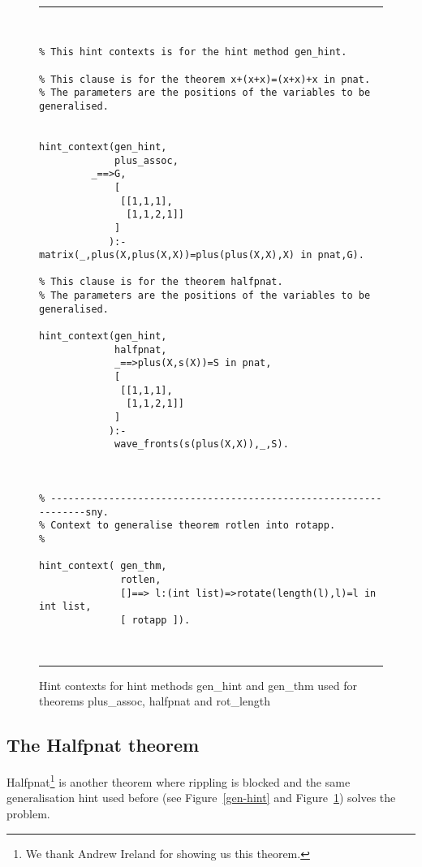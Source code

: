 \begin{figure}[htb] \begin{center} %
\hrule
\begin{small} 
\begin{verbatim} 


% This hint contexts is for the hint method gen_hint.

% This clause is for the theorem x+(x+x)=(x+x)+x in pnat.
% The parameters are the positions of the variables to be generalised. 


hint_context(gen_hint,
             plus_assoc,
	     _==>G,
             [
              [[1,1,1],
               [1,1,2,1]]
             ]
            ):- matrix(_,plus(X,plus(X,X))=plus(plus(X,X),X) in pnat,G).

% This clause is for the theorem halfpnat.
% The parameters are the positions of the variables to be generalised.

hint_context(gen_hint,
             halfpnat,
             _==>plus(X,s(X))=S in pnat,
             [
              [[1,1,1],
               [1,1,2,1]]
             ]
            ):-
             wave_fronts(s(plus(X,X)),_,S).



% -----------------------------------------------------------------sny.
% Context to generalise theorem rotlen into rotapp.
%

hint_context( gen_thm, 
              rotlen,  
              []==> l:(int list)=>rotate(length(l),l)=l in int list,
              [ rotapp ]).



\end{verbatim}
\end{small}
\end{center}
\caption{Hint contexts for hint methods gen\_hint and gen\_thm used
for theorems plus\_assoc, halfpnat and rot\_length} 
\label{contexts}
\hrule
\end{figure}

\subsection{The Halfpnat theorem}

        Halfpnat\footnote{We thank Andrew Ireland for showing us this
theorem.} is another theorem where rippling is blocked and the same
generalisation hint used before (see Figure~\ref{gen-hint} and
Figure~\ref{contexts}) solves the problem.

